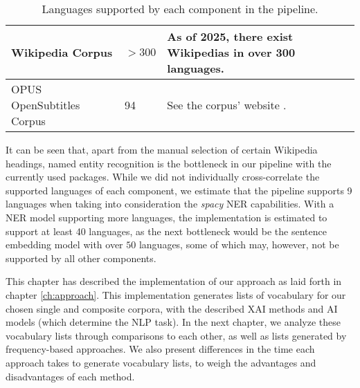 {\begin{table}[H]
\begin{tabularx}{\textwidth}{|X|X|X|}
		\hline
		Wikipedia Corpus                            & $>300$                       & As of 2025, there exist Wikipedias in over 300 languages\footnotemark[8].                                                                                                                                                                   \\
		\hline
		OPUS OpenSubtitles Corpus                   & 94                           & See the corpus' website \footnotemark[9].                                                                                                                                                                                                                       \\
		\hline
	\end{tabularx}



	\caption{Languages supported by each component in the pipeline.}
	\label{table:supported-languages}
\end{table}
}


It can be seen that, apart from the manual selection of certain Wikipedia headings, named entity recognition is the bottleneck in our pipeline with the currently used packages.
While we did not individually cross-correlate the supported languages of each component, we estimate that the pipeline supports 9 languages when taking into consideration the \textit{spacy} NER capabilities.
With a NER model supporting more languages, the implementation is estimated to support at least 40 languages, as the next bottleneck would be the sentence embedding model with over $50$ languages, some of which may, however, not be supported by all other components.

This chapter has described the implementation of our approach as laid forth in chapter \ref{ch:approach}.
This implementation generates lists of vocabulary for our chosen single and composite corpora, with the described XAI methods and AI models (which determine the NLP task).
In the next chapter, we analyze these vocabulary lists through comparisons to each other, as well as lists generated by frequency-based approaches.
We also present differences in the time each approach takes to generate vocabulary lists, to weigh the advantages and disadvantages of each method.


